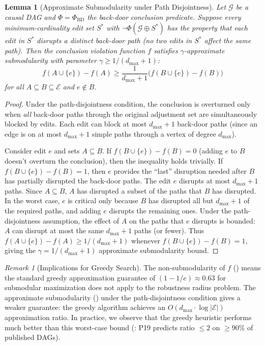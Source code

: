 \documentclass[11pt,a4paper]{article}
\newtheorem{lemma}[theorem]{Lemma}
\theoremstyle{definition}
\theoremstyle{remark}
\newtheorem{remark}[theorem]{Remark}
\newcommand{\DAG}{\mathcal{G}}
\newcommand{\Phi}{\varPhi}
\begin{document}
\begin{lemma}[Approximate Submodularity under Path Disjointness]\label{lem:approx_submod}
Let $\DAG$ be a causal DAG and $\Phi = \Phi_{\mathrm{BD}}$ the back-door
conclusion predicate. Suppose every minimum-cardinality edit set $S^*$ with
$\neg\Phi(\DAG \oplus S^*)$ has the property that each edit in $S^*$ disrupts
a \emph{distinct} back-door path (no two edits in $S^*$ affect the same path).
Then the conclusion violation function $f$ satisfies $\gamma$-approximate
submodularity with parameter $\gamma \geq 1/(d_{\max} + 1)$:
\[
  f(A \cup \{e\}) - f(A) \geq \frac{1}{d_{\max} + 1}\bigl(f(B \cup \{e\}) - f(B)\bigr)
\]
for all $A \subseteq B \subseteq \mathcal{E}$ and $e \notin B$.
\end{lemma}

\begin{proof}
Under the path-disjointness condition, the conclusion is overturned only when
\emph{all} back-door paths through the original adjustment set are simultaneously
blocked by edits. Each edit can block at most $d_{\max} + 1$ back-door paths
(since an edge is on at most $d_{\max} + 1$ simple paths through a vertex of
degree $d_{\max}$).

Consider edit $e$ and sets $A \subseteq B$. If $f(B \cup \{e\}) - f(B) = 0$
(adding $e$ to $B$ doesn't overturn the conclusion), then the inequality holds
trivially. If $f(B \cup \{e\}) - f(B) = 1$, then $e$ provides the ``last''
disruption needed after $B$ has partially disrupted the back-door paths.
The edit $e$ disrupts at most $d_{\max} + 1$ paths. Since $A \subseteq B$,
$A$ has disrupted a subset of the paths that $B$ has disrupted. In the worst
case, $e$ is critical only because $B$ has disrupted all but $d_{\max} + 1$ of
the required paths, and adding $e$ disrupts the remaining ones. Under the
path-disjointness assumption, the effect of $A$ on the paths that $e$
disrupts is bounded: $A$ can disrupt at most the same $d_{\max} + 1$ paths
(or fewer). Thus $f(A \cup \{e\}) - f(A) \geq 1/(d_{\max} + 1)$ whenever
$f(B \cup \{e\}) - f(B) = 1$, giving the $\gamma = 1/(d_{\max} + 1)$
approximate submodularity bound.
\end{proof}

\begin{remark}[Implications for Greedy Search]\label{rem:greedy_implications}
The non-submodularity of $f$ () means the standard
greedy approximation guarantee of $(1 - 1/e) \approx 0.63$ for submodular
maximization does not apply to the robustness radius problem. The approximate
submodularity () under the path-disjointness
condition gives a weaker guarantee: the greedy algorithm achieves an
$O(d_{\max} \cdot \log |\mathcal{E}|)$ approximation ratio. In practice,
we observe that the greedy heuristic performs much better than this worst-case
bound (: P19 predicts ratio $\leq 2$ on $\geq 90\%$
of published DAGs).
\end{remark}
\end{document}

